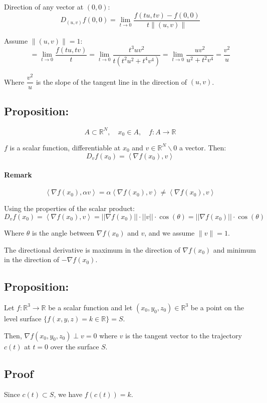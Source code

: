\documentclass[11pt]{article}
\newcommand{\inner}[2]{\left\langle #1, #2 \right\rangle}
\begin{document}
Direction of any vector at $(0,0)$:
\[
D_(u,v) f(0,0) = \lim_{t \to 0} \frac{f(tu, tv) - f(0,0)}{t \|(u,v)\|}
\]

Assume $\|(u,v)\| = 1$:
\[
= \lim_{t \to 0} \frac{f(tu, tv)}{t} = \lim_{t \to 0} \frac{t^3 u v^2}{t(t^2 u^2 + t^4 v^4)} = \lim_{t \to 0} \frac{u v^2}{u^2 + t^2 v^4} = \frac{v^2}{u}
\]

Where $\dfrac{v^2}{u}$ is the slope of the tangent line in the direction of $(u,v)$.

\subsection{Proposition:}
\[
A \subset \mathbb{R}^N, \quad x_0 \in A, \quad f : A \rightarrow \mathbb{R}
\]

$f$ is a scalar function, differentiable at $x_0$ and $v \in \mathbb{R}^N \backslash 0$ a vector. Then:
\[
D_v f(x_0) = \inner{\nabla f(x_0)}{v}
\]

\paragraph{Remark}
\[
\inner{\nabla f(x_0)}{\alpha v} = \alpha \inner{\nabla f(x_0)}{v} \neq \inner{\nabla f(x_0)}{v}
\]

Using the properties of the scalar product: 
\[
D_v f(x_0) = \inner{\nabla f(x_0)}{v} = ||\nabla f(x_0)|| \cdot ||v|| \cdot \cos(\theta) = ||\nabla f(x_0)|| \cdot \cos(\theta)
\]

Where $\theta$ is the angle between $\nabla f(x_0)$ and $v$, and we assume $\|v\| = 1$.

The directional derivative is maximum in the direction of $\nabla f(x_0)$ and minimum in the direction of $-\nabla f(x_0)$.

\subsection{Proposition:}
Let \( f: \mathbb{R}^3 \rightarrow \mathbb{R} \) be a scalar function and let \((x_0, y_0, z_0) \in \mathbb{R}^3\) be a point on the level surface \(\{ f(x, y, z) = k \in \mathbb{R} \} = S\).

Then, \( \nabla f(x_0, y_0, z_0) \perp v = 0 \) where \(v\) is the tangent vector to the trajectory \(c(t)\) at \(t = 0\) over the surface \(S\).

\subsection*{Proof}
Since \(c(t) \subset S\), we have \(f(c(t)) = k\).
\end{document}
